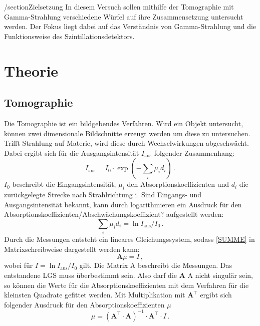 /section{Zielsetzung}
In diesem Versuch sollen mithilfe der Tomographie mit Gamma-Strahlung verschiedene Würfel auf ihre Zusammensetzung untersucht werden.
Der Fokus liegt dabei auf das Verständnis von Gamma-Strahlung und die Funktionsweise des Szintillationsdetektors.

\section{Theorie}
\label{sec:Theorie}

\subsection{Tomographie}
Die Tomographie ist ein bildgebendes Verfahren.
Wird ein Objekt untersucht, können zwei dimensionale Bildschnitte erzeugt werden um diese zu untersuchen.
Trifft Strahlung auf Materie, wird diese durch Wechselwirkungen abgeschwächt.
Dabei ergibt sich für die Ausgangsintensität $I_\text{aus}$ folgender Zusammenhang:
\begin{equation}
    I_\text{aus} = I_0 \cdot \exp{(- \sum_{i} \mu_i d_i)} \, .
\end{equation}
$I_0$ beschreibt die Eingangsintensität, $\mu_i$ den Absorptionskoeffizienten und $d_i$ die zurückgelegte Strecke nach Strahlrichtung i.
Sind Eingangs- und Ausgangsintensität bekannt, kann durch logarithmieren ein Ausdruck für den Absorptionskoeffizienten/Abschwächungskoeffizient? aufgestellt werden:
\begin{equation}
    \label{eqn:SUMME}
    \sum_{i} \mu_i d_i = \ln{I_\text{aus}/I_0} \, .
\end{equation}
Durch die Messungen entsteht ein lineares Gleichungssystem, sodass \eqref{SUMME} in Matrixschreibweise dargestellt werden kann:
\begin{equation}
    \label{eqn:matrix}
    \symbf{A} \mu = I \, ,
\end{equation}
wobei für $I = \ln{I_\text{aus}/I_0}$ gilt.
Die Matrix A beschreibt die Messungen.
Das entstandene LGS muss überbestimmt sein.
Also darf die $\symbf{A}$ A nicht singulär sein, so können die Werte für die Absorptionskoeffizienten mit dem Verfahren für die kleinsten Quadrate gefittet werden.
Mit Multiplikation mit $\symbf{A}^\top$ ergibt sich folgender Ausdruck für den Absorptionskoeffizienten $\mu$
\begin{equation}
    \mu = (\symbf{A}^\top \cdot \symbf{A})^{-1} \cdot \symbf{A}^\top \cdot I \, .
\end{equation}

